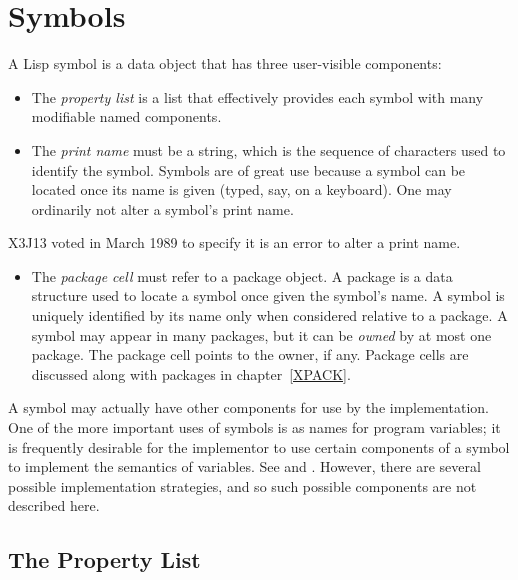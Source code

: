 
\clearpage\def\pagestatus{ULTIMATE}

\ifx \rulang\Undef

\chapter{Symbols}
\label{symbol}

A Lisp symbol is a data object that has three user-visible
components:
\begin{itemize}
\item
The \emph{property list} is a list that effectively provides each symbol
with many modifiable named components.

\item
The \emph{print name} must be a string, which is the sequence of
characters used to identify the symbol.  Symbols are of great use
because a symbol can be located once its name is given
(typed, say, on a keyboard).
One may ordinarily not alter a symbol's print name.
\end{itemize}

\begin{newer}
X3J13 voted in March 1989 
to specify it is an error to alter a print name.
\end{newer}
\begin{itemize}
\item
The \emph{package cell} must refer to a package object.
A package is a data structure
used to locate a symbol once given the symbol's name.
A symbol is uniquely identified
by its name only when considered relative to a package.  A symbol may
appear in many packages, but it can be \emph{owned} by at most one package.
The package cell points to the owner, if any.
Package cells are discussed along with packages in chapter~\ref{XPACK}.
\end{itemize}

A symbol may actually have other components for use by the
implementation.  One of the more important uses of symbols is as
names for program variables; it is frequently desirable for the
implementor to use certain components of a symbol to implement
the semantics of variables.  See 
and .
However, there are several possible
implementation strategies, and so such possible components are not
described here.

\section{The Property List}

